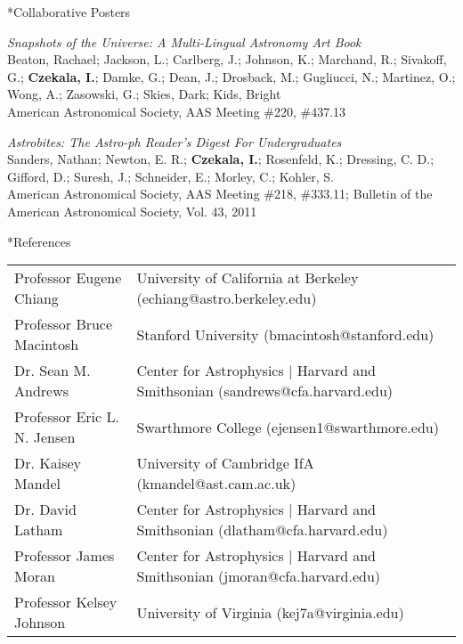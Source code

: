 \documentclass[10pt]{article}
\makeatletter
\renewcommand{\section}{\@startsection{section}{1}{0pt}{-\baselineskip}{0.5\baselineskip}{\scshape\color{myblue1}}}
\makeatother
\begin{document}
\section*{Collaborative Posters}
\begin{etaremune}
\item \emph{Snapshots of the Universe: A Multi-Lingual Astronomy Art Book}\\
Beaton, Rachael; Jackson, L.; Carlberg, J.; Johnson, K.; Marchand, R.; Sivakoff, G.; \textbf{Czekala, I.}; Damke, G.; Dean, J.; Drosback, M.; Gugliucci, N.; Martinez, O.; Wong, A.; Zasowski, G.; Skies, Dark; Kids, Bright\\
American Astronomical Society, AAS Meeting \#220, \#437.13
\item \emph{Astrobites: The Astro-ph Reader's Digest For Undergraduates}\\
Sanders, Nathan; Newton, E. R.; \textbf{Czekala, I.}; Rosenfeld, K.; Dressing, C. D.; Gifford, D.; Suresh, J.; Schneider, E.; Morley, C.; Kohler, S.\\
American Astronomical Society, AAS Meeting \#218, \#333.11; Bulletin of the American Astronomical Society, Vol. 43, 2011
\end{etaremune}

\section*{References}
\begin{tabular*}{\textwidth}{@{\hspace{10pt}}p{1.9in}l}
  Professor Eugene Chiang & University of California at Berkeley (echiang@astro.berkeley.edu) \\
  Professor Bruce Macintosh & Stanford University (bmacintosh@stanford.edu) \\
  Dr. Sean M. Andrews & Center for Astrophysics | Harvard and Smithsonian (sandrews@cfa.harvard.edu)\\
  Professor Eric L. N. Jensen & Swarthmore College (ejensen1@swarthmore.edu) \\
  Dr. Kaisey Mandel & University of Cambridge IfA (kmandel@ast.cam.ac.uk) \\
  Dr. David Latham & Center for Astrophysics | Harvard and Smithsonian (dlatham@cfa.harvard.edu) \\
  Professor James Moran & Center for Astrophysics | Harvard and Smithsonian (jmoran@cfa.harvard.edu) \\
  Professor Kelsey Johnson & University of Virginia (kej7a@virginia.edu) \\
\end{tabular*}
\end{document}
